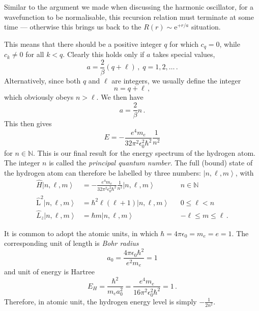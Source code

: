 \documentclass{article}
\theoremstyle{plain}\theoremheaderfont{\normalfont\itshape}\theorembodyfont{\rmfamily}\theoremseparator{.}\newtheorem*{rem}{Remark}\newtheorem*{ex}{Example}\newtheorem*{proof}{Proof}\newtheorem*{altp}{Alternative proof}
\theoremstyle{plain}\theoremheaderfont{\normalfont\bfseries}\theorembodyfont{\rmfamily}\theoremseparator{.}\newtheorem{thm}{Theorem}[section]\newtheorem{lem}[thm]{Lemma}\newtheorem{prop}[thm]{Proposition}\newtheorem*{cor}{Corollary}\newtheorem{defn}[thm]{Definition}\newtheorem{clm}[thm]{Claim}\newtheorem{clminproof}{Claim}
\theoremstyle{break}\theoremheaderfont{\normalfont\itshape}\theorembodyfont{\rmfamily}\theoremseparator{.\medskip}\newtheorem*{proofskip}{Proof}\newtheorem*{exs}{Examples}\newtheorem*{rems}{Remarks}
\theoremstyle{break}\theoremheaderfont{\normalfont\bfseries}\theorembodyfont{\rmfamily}\theoremseparator{.\medskip}\newtheorem{lemskip}[thm]{Lemma}\newtheorem{defnskip}[thm]{Definition}\newtheorem{propskip}[thm]{Proposition}\newtheorem{thmskip}[thm]{Theorem}
\numberwithin{equation}{section}
\newcommand{\ee}{\mathrm{e}}
\newcommand{\ket}[1]{\left| #1 \right\rangle}
\newcommand{\vb}[1]{\bm{\mathrm{#1}}}
\begin{document}
    Similar to the argument we made when discussing the harmonic oscillator, for a wavefunction to be normalisable, this recursion relation must terminate at some time --- otherwise this brings us back to the \(R(r)\sim \ee^{+r/a}\) situation.

    This means that there should be a positive integer \(q\) for which \(c_q=0\), while \(c_k\ne 0\) for all \(k<q\). Clearly this holds only if \(a\) takes special values,
   \begin{equation}
        a=\frac{2}{\beta}(q+\ell)\,,\; q=1,2,\dots\,.
    \end{equation}
    Alternatively, since both \(q\) and \(\ell\) are integers, we usually define the integer
   \begin{equation}
        n=q+\ell\,,
    \end{equation}
    which obviously obeys \(n>\ell\). We then have
   \begin{equation}
        a=\frac{2}{\beta}n\,.
    \end{equation}
    This then gives
    \begin{equation}\label{hydrogenenergy}
        E=-\frac{e^4m_e}{32\pi^2\epsilon_0^2\hbar^2}\frac{1}{n^2}
    \end{equation}
    for \(n\in\mathbb{N}\). This is our final result for the energy spectrum of the hydrogen atom. The integer \(n\) is called the \textit{principal quantum number}. The full (bound) state of the hydrogen atom can therefore be labelled by three numbers: \(\ket{n,\ell,m}\), with
    \begin{align}
        \hat{H}\ket{n,\ell,m}&=-\frac{e^4m_e}{32\pi^2\epsilon_0^2\hbar^2}\frac{1}{n^2}\ket{n,\ell,m} & &n\in\mathbb{N} \\
        \hat{\vb{L}}^2\ket{n,\ell,m}&=\hbar^2\ell(\ell+1)\ket{n,\ell,m} & &0\le\ell<n \\
        \hat{L}_z\ket{n,\ell,m}&=\hbar m\ket{n,\ell,m} & &-\ell\le m\le \ell\,.
    \end{align}

    It is common to adopt the atomic units, in which \(\hbar=4\pi\epsilon_0=m_e=e=1\). The corresponding unit of length is \textit{Bohr radius}
    \begin{equation}
        a_0=\frac{4\pi\epsilon_0\hbar^2}{e^2 m_e}=1
    \end{equation}
    and unit of energy is Hartree
    \begin{equation}
        E_H=\frac{\hbar^2}{m_e a_0^2}=\frac{e^4 m_e}{16\pi^2\epsilon_0^2\hbar^2}=1\,.
    \end{equation}
    Therefore, in atomic unit, the hydrogen energy level is simply \(-\frac{1}{2n^2}\).
\end{document}

